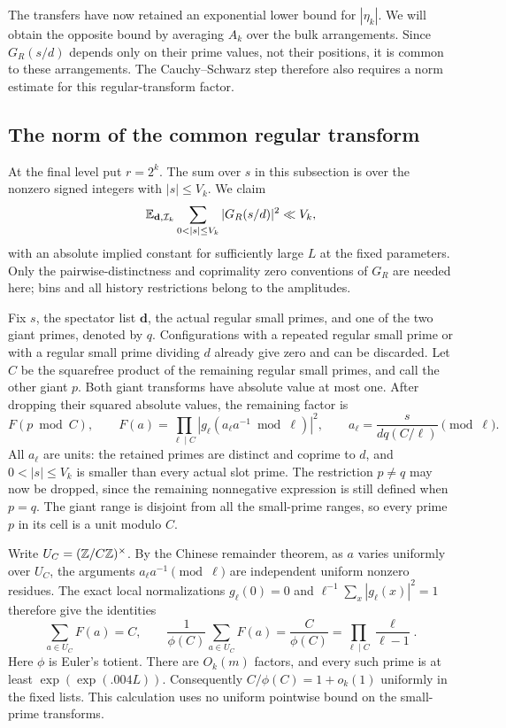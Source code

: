 The transfers have now retained an exponential lower bound for
$|\eta_k|$.  We will obtain the opposite bound by averaging $A_k$ over
the bulk arrangements.  Since $G_R(s/d)$ depends only on their prime
values, not their positions, it is common to these arrangements.
The Cauchy--Schwarz step therefore also requires a norm estimate for
this regular-transform factor.

\subsection{The norm of the common regular transform}

At the final level put $r=2^k$.  The sum over $s$ in this subsection is
over the nonzero signed integers with $|s|\le V_k$.  We claim
\begin{equation}\label{eq:conclusion-regular-norm}
 \E_{\mathbf d,\mathcal I_k}
       \sum_{0<|s|\le V_k}|G_R(s/d)|^2\ll V_k,
\end{equation}
with an absolute implied constant for sufficiently large $L$ at the
fixed parameters.  Only the pairwise-distinctness and coprimality zero
conventions of $G_R$ are needed here; bins and all history restrictions
belong to the amplitudes.

Fix $s$, the spectator list $\mathbf d$, the actual regular small
primes, and one of the two giant primes, denoted by $q$.  Configurations
with a repeated regular small prime or with a regular small prime
dividing $d$ already give zero and can be discarded.  Let $C$ be the
squarefree product of the remaining regular small primes, and call the
other giant $p$.  Both giant transforms have absolute value at most
one.  After dropping their squared absolute values, the remaining
factor is
\begin{equation}\label{eq:conclusion-residue-test}
 F(p\bmod C),\qquad
 F(a)=\prod_{\ell\mid C}
       \left|g_\ell(a_\ell a^{-1}\bmod\ell)\right|^2,
 \qquad
 a_\ell=\frac{s}{dq(C/\ell)}\pmod\ell .
\end{equation}
All $a_\ell$ are units: the retained primes are distinct and coprime to
$d$, and $0<|s|\le V_k$ is smaller than every actual slot prime.  The
restriction $p\ne q$ may now be dropped, since the remaining
nonnegative expression is still defined when $p=q$.  The giant range
is disjoint from all the small-prime ranges, so every prime $p$ in its
cell is a unit modulo $C$.

Write $U_C=(\mathbb Z/C\mathbb Z)^\times$.  By the Chinese remainder theorem, as $a$
varies uniformly over $U_C$, the arguments
$a_\ell a^{-1}\pmod\ell$ are independent uniform nonzero residues.
The exact local normalizations $g_\ell(0)=0$ and
$\ell^{-1}\sum_x|g_\ell(x)|^2=1$ therefore give the identities
\begin{equation}\label{eq:conclusion-crt-norm}
 \sum_{a\in U_C}F(a)=C,
 \qquad
 \frac1{\phi(C)}\sum_{a\in U_C}F(a)
   =\frac C{\phi(C)}
   =\prod_{\ell\mid C}\frac\ell{\ell-1}.
\end{equation}
Here $\phi$ is Euler's totient.  There are $O_k(m)$ factors, and every
such prime is at least $\exp(\exp(.004L))$.  Consequently
$C/\phi(C)=1+o_k(1)$ uniformly in the fixed lists.  This calculation
uses no uniform pointwise bound on the small-prime transforms.

